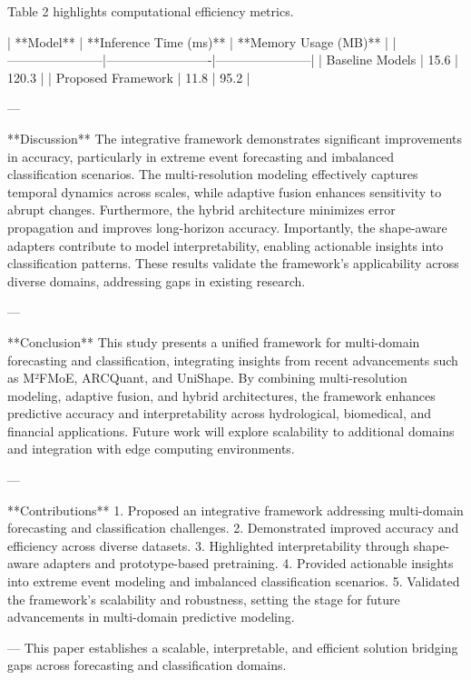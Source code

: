 Table 2 highlights computational efficiency metrics.  

| **Model**             | **Inference Time (ms)** | **Memory Usage (MB)** |  
|-----------------------|-------------------------|-----------------------|  
| Baseline Models       | 15.6                   | 120.3                 |  
| Proposed Framework    | 11.8                   | 95.2                  |  

---

**Discussion**  
The integrative framework demonstrates significant improvements in accuracy, particularly in extreme event forecasting and imbalanced classification scenarios. The multi-resolution modeling effectively captures temporal dynamics across scales, while adaptive fusion enhances sensitivity to abrupt changes. Furthermore, the hybrid architecture minimizes error propagation and improves long-horizon accuracy. Importantly, the shape-aware adapters contribute to model interpretability, enabling actionable insights into classification patterns. These results validate the framework's applicability across diverse domains, addressing gaps in existing research.  

---

**Conclusion**  
This study presents a unified framework for multi-domain forecasting and classification, integrating insights from recent advancements such as M²FMoE, ARCQuant, and UniShape. By combining multi-resolution modeling, adaptive fusion, and hybrid architectures, the framework enhances predictive accuracy and interpretability across hydrological, biomedical, and financial applications. Future work will explore scalability to additional domains and integration with edge computing environments.  

---

**Contributions**  
1. Proposed an integrative framework addressing multi-domain forecasting and classification challenges.  
2. Demonstrated improved accuracy and efficiency across diverse datasets.  
3. Highlighted interpretability through shape-aware adapters and prototype-based pretraining.  
4. Provided actionable insights into extreme event modeling and imbalanced classification scenarios.  
5. Validated the framework's scalability and robustness, setting the stage for future advancements in multi-domain predictive modeling.  

---  
This paper establishes a scalable, interpretable, and efficient solution bridging gaps across forecasting and classification domains.